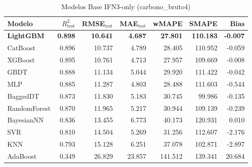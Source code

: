 \begin{table}[H]
    \centering
    \caption{Modelos Base IFN3-only (carbono_bruto4)}
    \label{tab:base_ifn3_carbono_bruto4}
    \begin{tabular}{lrrrrrr}
        \toprule
        Modelo & $R^2_{\text{test}}$ & RMSE$_{\text{test}}$ & MAE$_{\text{test}}$ & wMAPE & SMAPE & Bias \\
        \midrule
        \textbf{LightGBM} & \textbf{0.898} & \textbf{10.641} & \textbf{4.687} & \textbf{27.801} & \textbf{110.183} & \textbf{-0.007} \\
        CatBoost & 0.896 & 10.737 & 4.789 & 28.405 & 110.952 & -0.059 \\
        XGBoost & 0.895 & 10.761 & 4.713 & 27.957 & 109.669 & -0.008 \\
        GBDT & 0.888 & 11.134 & 5.044 & 29.920 & 111.422 & -0.042 \\
        MLP & 0.885 & 11.287 & 4.803 & 28.488 & 111.603 & -0.544 \\
        BaggedDT & 0.873 & 11.830 & 5.183 & 30.745 & 99.986 & -0.135 \\
        RandomForest & 0.870 & 11.965 & 5.217 & 30.944 & 109.139 & -0.239 \\
        BayesianNN & 0.836 & 13.455 & 6.773 & 40.173 & 120.931 & 0.010 \\
        SVR & 0.810 & 14.504 & 5.269 & 31.256 & 112.607 & -2.176 \\
        KNN & 0.793 & 15.128 & 6.251 & 37.078 & 102.871 & -2.897 \\
        AdaBoost & 0.349 & 26.829 & 23.857 & 141.512 & 139.341 & 20.684 \\
        \bottomrule
    \end{tabular}
\end{table}

